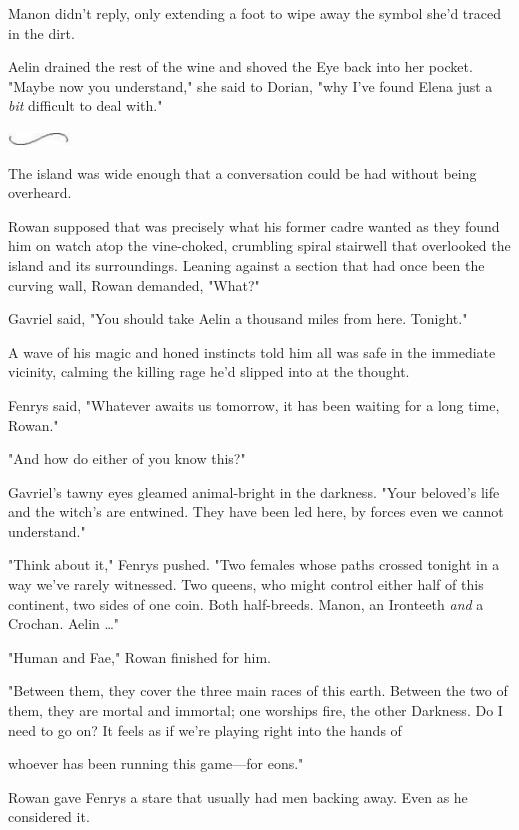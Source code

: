 Manon didn't reply, only extending a foot to wipe away the symbol she'd traced in the dirt.

Aelin drained the rest of the wine and shoved the Eye back into her pocket. "Maybe now you understand," she said to Dorian, "why I've found Elena just a \emph{bit} difficult to deal with."

\includegraphics[width=0.65in,height=0.13in]{images/seperator}

The island was wide enough that a conversation could be had without being overheard.

Rowan supposed that was precisely what his former cadre wanted as they found him on watch atop the vine-choked, crumbling spiral stairwell that overlooked the island and its surroundings. Leaning against a section that had once been the curving wall, Rowan demanded, "What?"

Gavriel said, "You should take Aelin a thousand miles from here. Tonight."

A wave of his magic and honed instincts told him all was safe in the immediate vicinity, calming the killing rage he'd slipped into at the thought.

Fenrys said, "Whatever awaits us tomorrow, it has been waiting for a long time, Rowan."

"And how do either of you know this?"

Gavriel's tawny eyes gleamed animal-bright in the darkness. "Your beloved's life and the witch's are entwined. They have been led here, by forces even we cannot understand."

"Think about it," Fenrys pushed. "Two females whose paths crossed tonight in a way we've rarely witnessed. Two queens, who might control either half of this continent, two sides of one coin. Both half-breeds. Manon, an Ironteeth \emph{and} a Crochan. Aelin \ldots"

"Human and Fae," Rowan finished for him.

"Between them, they cover the three main races of this earth. Between the two of them, they are mortal and immortal; one worships fire, the other Darkness. Do I need to go on? It feels as if we're playing right into the hands of

whoever has been running this game---for eons."

Rowan gave Fenrys a stare that usually had men backing away. Even as he considered it.

